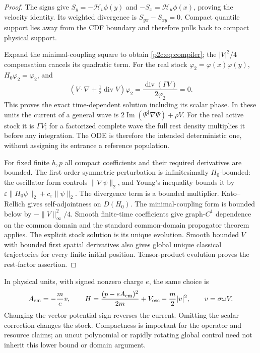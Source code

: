 \documentclass[11pt]{article}
\numberwithin{equation}{section}
\theoremstyle{definition}
\theoremstyle{remark}
\begin{document}
\begin{proof}
The signs give
$S_y=-\mathcal H_v\phi(y)$ and
$-S_x=\mathcal H_u\phi(x)$, proving the velocity identity.
Its weighted divergence is $S_{yx}-S_{xy}=0$.
Compact quantile support lies away from the CDF boundary
and therefore pulls back to compact physical support.

Expand the minimal-coupling square to obtain
\eqref{p2c:eq:compiler}; the $|V|^2/4$ compensation
cancels its quadratic term. For the real stock
$\varphi_2=\varphi(x)\varphi(y)$, $H_0\varphi_2=\varphi_2$,
and
\[
 \left(V\cdot\nabla+\tfrac12\operatorname{div}V\right)
 \varphi_2
 =\frac{\operatorname{div}(\Gamma V)}{2\varphi_2}=0.
\]
This proves the exact time-dependent solution including
its scalar phase. In these units the current of a
general wave is
$2\operatorname{Im}(\Psi^\dagger\nabla\Psi)+\rho V$.
For the real active stock it is $\Gamma V$; for a
factorized complete wave the full rest density
multiplies it before any integration. The ODE is
therefore the intended deterministic one, without
assigning its entrance a reference population.

For fixed finite $h,p$ all compact coefficients and their
required derivatives are bounded. The first-order
symmetric perturbation is infinitesimally $H_0$-bounded:
the oscillator form controls $\|\nabla\psi\|_2$, and
Young's inequality bounds it by
$\varepsilon\|H_0\psi\|_2+c_\varepsilon\|\psi\|_2$.
The divergence term is a bounded multiplier.
Kato--Rellich gives self-adjointness on $D(H_0)$.
The minimal-coupling form is bounded below by
$-\|V\|_\infty^2/4$. Smooth finite-time coefficients
give graph-$C^1$ dependence on the common domain and
the standard common-domain propagator theorem
\cite{SchmidGriesemer2014} applies. The explicit
stock solution is its unique evolution. Smooth bounded
$V$ with bounded first spatial derivatives also gives
global unique classical trajectories for every finite
initial position. Tensor-product evolution proves the
rest-factor assertion.
\end{proof}

In physical units, with signed nonzero charge $e$, the
same choice is
\[
 A_{\rm em}=-\frac{m}{e}v,\qquad
 H=\frac{(p-eA_{\rm em})^2}{2m}
      +V_{\rm osc}-\frac m2|v|^2,\qquad
 v=\sigma\omega V.
\]
Changing the vector-potential sign reverses the current.
Omitting the scalar correction changes the stock.
Compactness is important for the operator and resource
claims; an uncut polynomial or rapidly rotating global
control need not inherit this lower bound or domain
argument.
\end{document}
